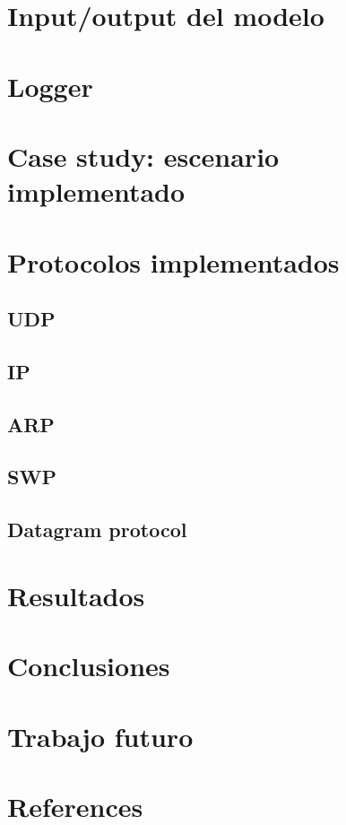 \documentclass[10pt,a4paper]{article}
\begin{document}
\section{Input/output del modelo}
\section{Logger}
\section{Case study: escenario implementado}
\section{Protocolos implementados}
\subsection{UDP}
\subsection{IP}
\subsection{ARP}
\subsection{SWP}
\subsection{Datagram protocol}
\section{Resultados}
\section{Conclusiones}
\section{Trabajo futuro}
\section{References}


\end{document}
